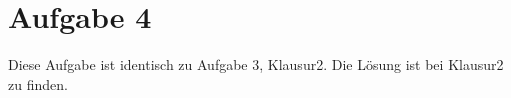 \section*{Aufgabe 4}

Diese Aufgabe ist identisch zu Aufgabe 3, Klausur2.
Die Lösung ist bei Klausur2 zu finden.
